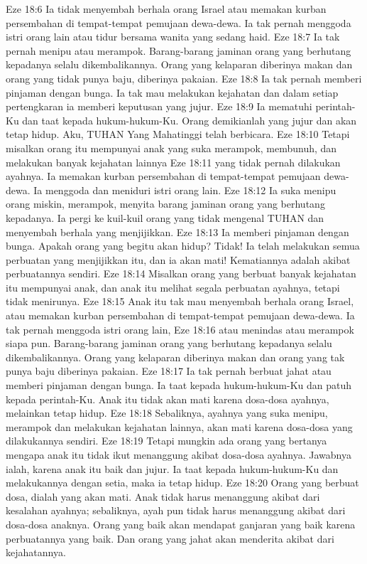 Eze 18:6  Ia tidak menyembah berhala orang Israel atau memakan kurban persembahan di tempat-tempat pemujaan dewa-dewa. Ia tak pernah menggoda istri orang lain atau tidur bersama wanita yang sedang haid.
Eze 18:7  Ia tak pernah menipu atau merampok. Barang-barang jaminan orang yang berhutang kepadanya selalu dikembalikannya. Orang yang kelaparan diberinya makan dan orang yang tidak punya baju, diberinya pakaian.
Eze 18:8  Ia tak pernah memberi pinjaman dengan bunga. Ia tak mau melakukan kejahatan dan dalam setiap pertengkaran ia memberi keputusan yang jujur.
Eze 18:9  Ia mematuhi perintah-Ku dan taat kepada hukum-hukum-Ku. Orang demikianlah yang jujur dan akan tetap hidup. Aku, TUHAN Yang Mahatinggi telah berbicara.
Eze 18:10  Tetapi misalkan orang itu mempunyai anak yang suka merampok, membunuh, dan melakukan banyak kejahatan lainnya
Eze 18:11  yang tidak pernah dilakukan ayahnya. Ia memakan kurban persembahan di tempat-tempat pemujaan dewa-dewa. Ia menggoda dan meniduri istri orang lain.
Eze 18:12  Ia suka menipu orang miskin, merampok, menyita barang jaminan orang yang berhutang kepadanya. Ia pergi ke kuil-kuil orang yang tidak mengenal TUHAN dan menyembah berhala yang menjijikkan.
Eze 18:13  Ia memberi pinjaman dengan bunga. Apakah orang yang begitu akan hidup? Tidak! Ia telah melakukan semua perbuatan yang menjijikkan itu, dan ia akan mati! Kematiannya adalah akibat perbuatannya sendiri.
Eze 18:14  Misalkan orang yang berbuat banyak kejahatan itu mempunyai anak, dan anak itu melihat segala perbuatan ayahnya, tetapi tidak menirunya.
Eze 18:15  Anak itu tak mau menyembah berhala orang Israel, atau memakan kurban persembahan di tempat-tempat pemujaan dewa-dewa. Ia tak pernah menggoda istri orang lain,
Eze 18:16  atau menindas atau merampok siapa pun. Barang-barang jaminan orang yang berhutang kepadanya selalu dikembalikannya. Orang yang kelaparan diberinya makan dan orang yang tak punya baju diberinya pakaian.
Eze 18:17  Ia tak pernah berbuat jahat atau memberi pinjaman dengan bunga. Ia taat kepada hukum-hukum-Ku dan patuh kepada perintah-Ku. Anak itu tidak akan mati karena dosa-dosa ayahnya, melainkan tetap hidup.
Eze 18:18  Sebaliknya, ayahnya yang suka menipu, merampok dan melakukan kejahatan lainnya, akan mati karena dosa-dosa yang dilakukannya sendiri.
Eze 18:19  Tetapi mungkin ada orang yang bertanya mengapa anak itu tidak ikut menanggung akibat dosa-dosa ayahnya. Jawabnya ialah, karena anak itu baik dan jujur. Ia taat kepada hukum-hukum-Ku dan melakukannya dengan setia, maka ia tetap hidup.
Eze 18:20  Orang yang berbuat dosa, dialah yang akan mati. Anak tidak harus menanggung akibat dari kesalahan ayahnya; sebaliknya, ayah pun tidak harus menanggung akibat dari dosa-dosa anaknya. Orang yang baik akan mendapat ganjaran yang baik karena perbuatannya yang baik. Dan orang yang jahat akan menderita akibat dari kejahatannya.
